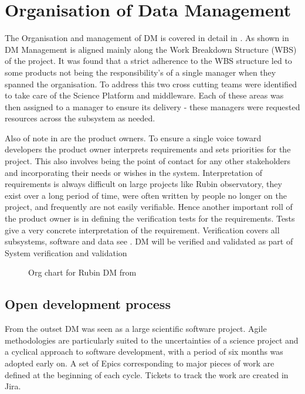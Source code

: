 
\section{Organisation of Data Management} \label{sec:org}

The Organisation and management of DM is covered in detail in \cite{LDM-294}.
As shown in  DM Management is aligned mainly along the Work Breakdown Structure (WBS) of the project.
It was found that a strict adherence to the WBS structure led to some products not being the responsibility's of a single manager when they spanned the organisation.
To address this two cross cutting teams were identified  to take care of the Science Platform and middleware.
Each of these areas was then assigned to a manager to ensure its delivery - these managers were requested resources across the subsystem as needed.

Also of note in  are the product owners.
To ensure a single voice toward developers the product owner interprets requirements and sets priorities for the
project.
This also involves being the point of contact for any other stakeholders and incorporating their needs or wishes in the system.
Interpretation of requirements is always difficult on large projects like Rubin observatory, they exist over a long period of time, were often written by people no longer on the project, and frequently are not easily verifiable.
Hence another important roll of the product owner is in defining the verification tests for the requirements.
Tests give a very concrete interpretation of the requirement.
Verification covers all subsystems, software and data  see \cite{PSTN-024}.
  DM will be verified and validated as part of System verification and validation \cite{2014SPIE.9150E..0NS} \cite {PSTN-029}



\begin{figure}
\caption{Org chart for Rubin DM from \cite{LDM-294}\label{fig:org}}
\end{figure}

\subsection{Open development process}\label{sec:devproc}
From the outset DM was seen as a large scientific  software project.
Agile methodologies \cite{it:agile}  are particularly suited to the uncertainties of a science project and
a cyclical approach to software development, with a period of six months was adopted early on.
A set of Epics corresponding to major pieces of work are defined at the beginning of each cycle.
Tickets to track the work are created in Jira.

